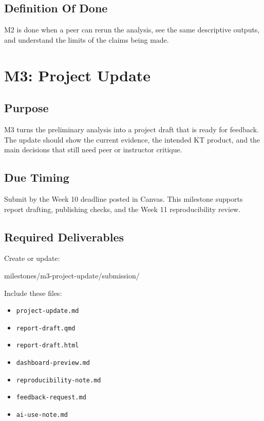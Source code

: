 \documentclass[
  letterpaper,
  DIV=11,
  numbers=noendperiod,
  oneside]{scrreprt}
\newenvironment{Shaded}{\begin{snugshade}}{\end{snugshade}}
\newcommand{\NormalTok}[1]{\textcolor[rgb]{0.00,0.23,0.31}{#1}}
\providecommand{\tightlist}{%
  \setlength{\itemsep}{0pt}\setlength{\parskip}{0pt}}
\begin{document}
\section{Definition Of Done}\label{definition-of-done-5}

M2 is done when a peer can rerun the analysis, see the same descriptive
outputs, and understand the limits of the claims being made.

\chapter{M3: Project Update}\label{m3-project-update}

\section{Purpose}\label{purpose-4}

M3 turns the preliminary analysis into a project draft that is ready for
feedback. The update should show the current evidence, the intended KT
product, and the main decisions that still need peer or instructor
critique.

\section{Due Timing}\label{due-timing-3}

Submit by the Week 10 deadline posted in Canvas. This milestone supports
report drafting, publishing checks, and the Week 11 reproducibility
review.

\section{Required Deliverables}\label{required-deliverables-3}

Create or update:

\begin{Shaded}
\begin{Highlighting}[numbers=left,,]
\NormalTok{milestones/m3{-}project{-}update/submission/}
\end{Highlighting}
\end{Shaded}

Include these files:

\begin{itemize}
\tightlist
\item
  \texttt{project-update.md}
\item
  \texttt{report-draft.qmd}
\item
  \texttt{report-draft.html}
\item
  \texttt{dashboard-preview.md}
\item
  \texttt{reproducibility-note.md}
\item
  \texttt{feedback-request.md}
\item
  \texttt{ai-use-note.md}
\end{itemize}
\end{document}
